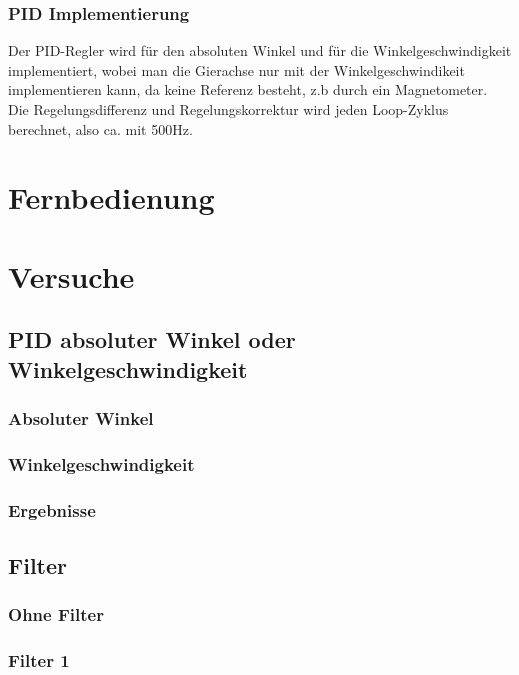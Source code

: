 \documentclass[12pt,a4paper, ngerman]{article}
\begin{document}
\subsubsection{PID Implementierung}
Der PID-Regler wird für den absoluten Winkel und für die Winkelgeschwindigkeit implementiert, wobei man die Gierachse nur mit der Winkelgeschwindikeit implementieren kann, da keine Referenz besteht, z.b durch ein Magnetometer. Die Regelungsdifferenz und Regelungskorrektur wird jeden Loop-Zyklus berechnet, also ca. mit 500Hz.  

\section{Fernbedienung}

\section{Versuche}

\subsection{PID absoluter Winkel oder Winkelgeschwindigkeit}

\subsubsection{Absoluter Winkel}

\subsubsection{Winkelgeschwindigkeit}

\subsubsection{Ergebnisse}

\subsection{Filter}

\subsubsection{Ohne Filter}

\subsubsection{Filter 1}
\end{document}
